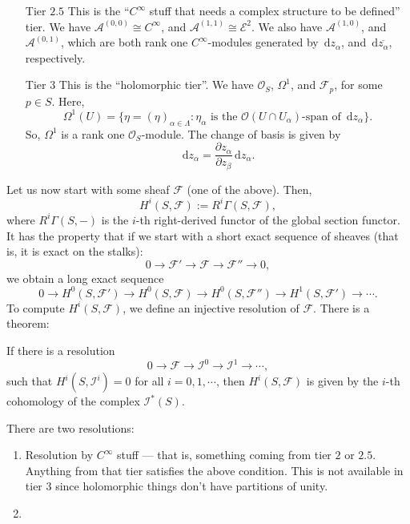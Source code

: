 \documentclass[a4paper]{report}
\theoremstyle{definition}
\theoremstyle{remark}
\theoremstyle{proposition}
\theoremstyle{conjecture}
\theoremstyle{lemma}
\theoremstyle{corollary}
\theoremstyle{exercise}
\theoremstyle{example}
\newcommand{\mcal}{\mathcal}
\newcommand{\diff}{\,\mathrm{d}}
\begin{document}
\begin{enumerate}
    \item[Tier $2.5$] This is the 
        ``$C^\infty$ stuff that needs a complex structure to be defined'' tier.
        We have $\mcal{A}^{(0,0)} \cong C^\infty$, and $\mcal{A}^{(1,1)}\cong \mcal{E}^2$. We also have $\mcal{A}^{(1,0)}$, and $\mcal{A}^{(0,1)}$, which 
        are both rank one $C^\infty$-modules generated by $\diff z_\alpha$, and
        $\diff \overline{z_\alpha}$, respectively.

    \item[Tier $3$] This is the ``holomorphic tier''. We have $\mcal{O}_S$, 
        $\Omega^1$, and $\mcal{F}_p$, for some $p\in S$. Here, 
        $$\Omega^1(U) = \lbrace \eta = (\eta)_{\alpha \in\Lambda} : \text{$\eta_\alpha$ is the $\mcal{O}(U\cap U_\alpha)$-span of $\diff z_\alpha$}\rbrace.$$
        So, $\Omega^1$ is a rank one $\mcal{O}_S$-module.
        The change of basis is given by 
        $$\diff z_\alpha = \frac{\partial z_\alpha}{\partial z_\beta}\diff z_\alpha.$$
\end{enumerate}

Let us now start with some sheaf $\mcal{F}$ (one of the above). 
Then, $$H^i(S,\mcal{F}) := R^i\Gamma(S,\mcal{F}),$$
where $R^i\Gamma(S,-)$ is the $i$-th right-derived functor of the global 
section functor. It has the property that if we start with a short 
exact sequence of sheaves (that is, it is exact on the stalks):
$$0\longrightarrow \mcal{F} ' \longrightarrow\mcal{F} \longrightarrow\mcal{F}''\longrightarrow 0,$$
we obtain a long exact sequence
$$0\longrightarrow H^0(S,\mcal{F}') \longrightarrow H^0(S,\mcal{F})\longrightarrow H^0(S,\mcal{F}'') \longrightarrow H^1(S,\mcal{F}')\longrightarrow\cdots.$$
To compute $H^i(S,\mcal{F})$, we define an injective resolution of $\mcal{F}$.
There is a theorem:
\begin{theorem}
    If there is a resolution 
    $$0\longrightarrow \mcal{F} \longrightarrow \mcal{I}^0 \longrightarrow \mcal{I}^1\longrightarrow\cdots,$$
    such that $H^i(S,\mcal{I}^i) = 0$ for all $i=0,1,\cdots$, then
    $H^i(S,\mcal{F})$ is given by the $i$-th cohomology of the complex 
    $\mcal{I}^\ast(S)$.
\end{theorem}

There are two resolutions:
\begin{enumerate}
    \item Resolution by $C^\infty$ stuff --- that is, something coming from 
        tier $2$ or $2.5$. Anything from that tier satisfies the above 
        condition. This is not available in tier $3$ since holomorphic 
        things don't have partitions of unity.
    \item 
\end{enumerate}
\end{document}
